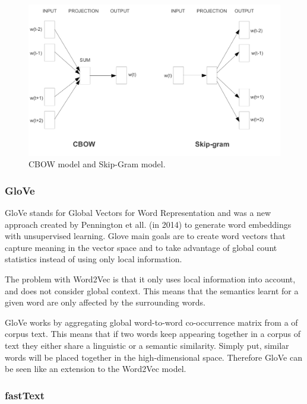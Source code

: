         \begin{figure}[htb]
            \centering
            \includegraphics[scale = 0.15]{Sections/3StateOfTheArt/3_images/Cbow_Skip.png}
            \caption{CBOW model and Skip-Gram model. \cite{Mikolov2013}} 
        \end{figure}

        
        \subsubsection{GloVe}
            \par GloVe stands for Global Vectors for Word Representation and was a new approach created by Pennington et all. (in 2014) \cite{Pennington2014} to generate word embeddings with unsupervised learning. Glove main goals are to create word vectors that capture meaning in the vector space and to take advantage of global count statistics instead of using only local information. 
            \par The problem with Word2Vec is that it only uses local information into account, and does not consider global context. This means that the semantics learnt for a given word are only affected by the surrounding words. 
            \par GloVe works by aggregating global word-to-word co-occurrence matrix from a of corpus text. This means that if two words keep appearing together in a corpus of text they either share a linguistic or a semantic similarity. Simply put, similar words will be placed together in the high-dimensional space. Therefore GloVe can be seen like an extension to the Word2Vec model.

        \subsubsection{fastText}
    
